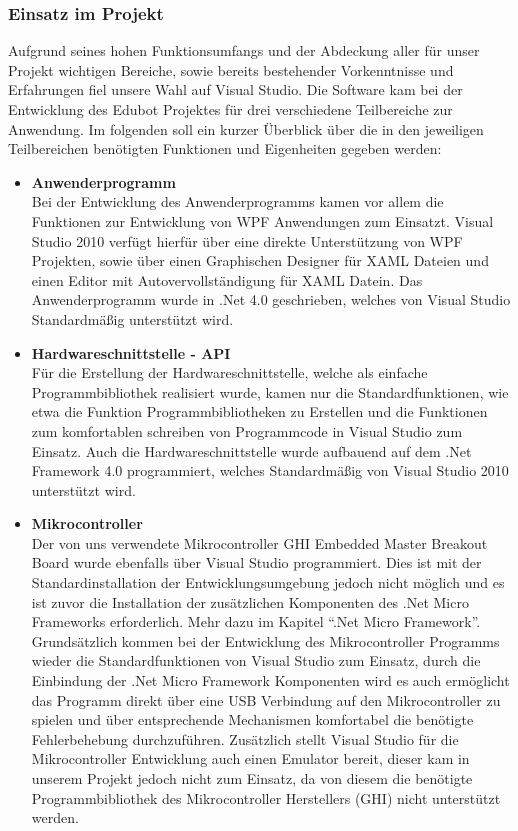 \subsubsection{Einsatz im Projekt}
Aufgrund seines hohen Funktionsumfangs und der Abdeckung aller für unser Projekt wichtigen Bereiche, sowie bereits bestehender Vorkenntnisse und Erfahrungen fiel unsere Wahl auf Visual Studio.
Die Software kam bei der Entwicklung des Edubot Projektes für drei verschiedene Teilbereiche zur Anwendung. Im folgenden soll ein kurzer Überblick über die in den jeweiligen Teilbereichen benötigten Funktionen und Eigenheiten gegeben werden:
\begin{itemize}
\item \textbf{Anwenderprogramm}\\
Bei der Entwicklung des Anwenderprogramms kamen vor allem die Funktionen zur Entwicklung von WPF Anwendungen zum Einsatzt. Visual Studio 2010 verfügt hierfür über eine direkte Unterstützung von WPF Projekten, sowie über einen Graphischen Designer für XAML Dateien und einen Editor mit Autovervollständigung für XAML Datein. Das Anwenderprogramm wurde in .Net 4.0 geschrieben, welches von Visual Studio Standardmäßig unterstützt wird.
\item \textbf{Hardwareschnittstelle - API}\\
Für die Erstellung der Hardwareschnittstelle, welche als einfache Programmbibliothek realisiert wurde, kamen nur die Standardfunktionen, wie etwa die Funktion Programmbibliotheken zu Erstellen und die Funktionen zum komfortablen schreiben von Programmcode in Visual Studio zum Einsatz. Auch die Hardwareschnittstelle wurde aufbauend auf dem .Net Framework 4.0 programmiert, welches Standardmäßig von Visual Studio 2010 unterstützt wird.
\item \textbf{Mikrocontroller}\\
Der von uns verwendete Mikrocontroller GHI Embedded Master Breakout Board wurde ebenfalls über Visual Studio programmiert. Dies ist mit der Standardinstallation der Entwicklungsumgebung jedoch nicht möglich und es ist zuvor die Installation der zusätzlichen Komponenten des .Net Micro Frameworks erforderlich. Mehr dazu im Kapitel “.Net Micro Framework”.
Grundsätzlich kommen bei der Entwicklung des Mikrocontroller Programms wieder die Standardfunktionen von Visual Studio zum Einsatz, durch die Einbindung der .Net Micro Framework Komponenten wird es auch ermöglicht das Programm direkt über eine USB Verbindung auf den Mikrocontroller zu spielen und über entsprechende Mechanismen komfortabel die benötigte Fehlerbehebung durchzuführen.
Zusätzlich stellt Visual Studio für die Mikrocontroller Entwicklung auch einen Emulator bereit, dieser kam in unserem Projekt jedoch nicht zum Einsatz, da von diesem die benötigte Programmbibliothek des Mikrocontroller Herstellers (GHI) nicht unterstützt werden.
\end{itemize}